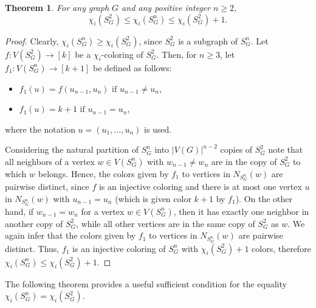 \documentclass{article}
\newtheorem{theorem}{Theorem}[section]
\begin{document}
\begin{theorem}
For any graph $G$ and any positive integer $n\ge 2$,
	$$\chi_i(S_G^2)\le \chi_i(S_G^n)\le \chi_i(S_G^2)+1.$$
\vskip -0.2cm
\label{thm:SG2}
\end{theorem}
\begin{proof}
Clearly, $\chi_i(S_G^n)\geq \chi_i(S_G^2)$, since $S_G^2$ is a subgraph of $S_G^n$. Let $f:V(S_G^2)\rightarrow [k]$ be a $\chi_i$-coloring of $S_G^2$. Then, for $n\ge 3$, let $f_1:V(S_G^n)\rightarrow [k+1]$ be defined as follows:
	\begin{itemize}[noitemsep]
		\item $f_1(u)=f(u_{n-1},u_{n}) \text{ if } u_{n-1}\neq u_n$,
		\item $f_1(u)=k+1 \text{ if }  u_{n-1}= u_n$,
	\end{itemize}
where the notation $u=(u_1,\ldots,u_n)$ is used.

Considering the natural partition of $S_G^n$ into $|V(G)|^{n-2}$ copies of $S_G^2$ note that all neighbors of a vertex $w\in V(S_G^n)$ with $w_{n-1}\ne w_{n}$ are in the copy of $S_G^2$ to which $w$ belongs. Hence, the colors given by $f_1$ to vertices in $N_{S_G^n}(w)$ are pairwise distinct, since $f$ is an injective coloring and there is at most one vertex $u$ in $N_{S_G^n}(w)$ with $u_{n-1}=u_n$ (which is given color $k+1$ by $f_1$). On the other hand, if $w_{n-1}= w_n$ for a vertex $w\in V(S_G^n)$, then it has exactly one neighbor in another copy of $S_G^2$, while all other vertices are in the same copy of $S_G^2$ as $w$. We again infer that the colors given by $f_1$ to vertices in $N_{S_G^n}(w)$ are pairwise distinct. Thus, $f_1$ is an injective coloring of $S_G^n$ with $\chi_i(S_G^2)+1$ colors, therefore $\chi_i(S_G^n)\le \chi_i(S_G^2)+1$.
\end{proof}	


The following theorem provides a useful sufficient condition for the equality $\chi_i(S_G^n)= \chi_i(S_G^2)$. 
\end{document}
